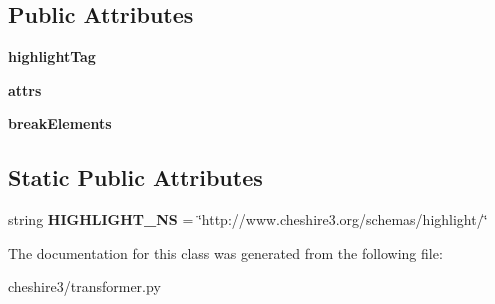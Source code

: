 \subsection*{Public Attributes}
\begin{DoxyCompactItemize}
\item 
\hypertarget{classcheshire3_1_1transformer_1_1_lxml_query_term_highlighting_transformer_a2153b3e3039618549755b5c00d0b582f}{{\bfseries highlight\-Tag}}\label{classcheshire3_1_1transformer_1_1_lxml_query_term_highlighting_transformer_a2153b3e3039618549755b5c00d0b582f}

\item 
\hypertarget{classcheshire3_1_1transformer_1_1_lxml_query_term_highlighting_transformer_a5dabf4187498d62a4de0b1b15d3680a9}{{\bfseries attrs}}\label{classcheshire3_1_1transformer_1_1_lxml_query_term_highlighting_transformer_a5dabf4187498d62a4de0b1b15d3680a9}

\item 
\hypertarget{classcheshire3_1_1transformer_1_1_lxml_query_term_highlighting_transformer_aac01aea8d3063d7f1ff82f24fc9f48d4}{{\bfseries break\-Elements}}\label{classcheshire3_1_1transformer_1_1_lxml_query_term_highlighting_transformer_aac01aea8d3063d7f1ff82f24fc9f48d4}

\end{DoxyCompactItemize}
\subsection*{Static Public Attributes}
\begin{DoxyCompactItemize}
\item 
\hypertarget{classcheshire3_1_1transformer_1_1_lxml_query_term_highlighting_transformer_a5962c5973363e93684fd729f85e0407c}{string {\bfseries H\-I\-G\-H\-L\-I\-G\-H\-T\-\_\-\-N\-S} = \char`\"{}http\-://www.\-cheshire3.\-org/schemas/highlight/\char`\"{}}\label{classcheshire3_1_1transformer_1_1_lxml_query_term_highlighting_transformer_a5962c5973363e93684fd729f85e0407c}

\end{DoxyCompactItemize}


The documentation for this class was generated from the following file\-:\begin{DoxyCompactItemize}
\item 
cheshire3/transformer.\-py\end{DoxyCompactItemize}

